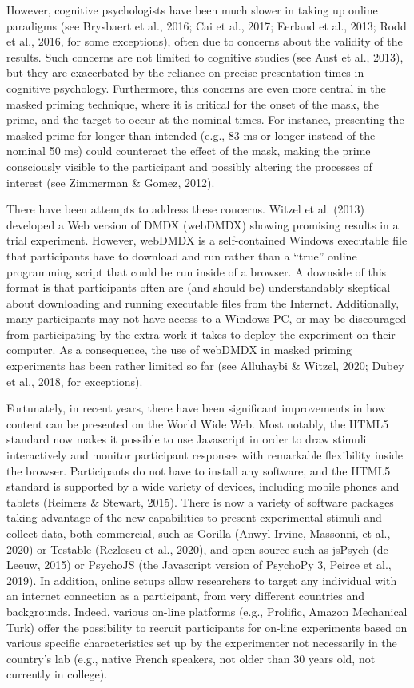 \documentclass[
  english,
  man,floatsintext]{apa6}
\begin{document}
However, cognitive psychologists have been much slower in taking up online paradigms (see Brysbaert et al., 2016; Cai et al., 2017; Eerland et al., 2013; Rodd et al., 2016, for some exceptions), often due to concerns about the validity of the results. Such concerns are not limited to cognitive studies (see Aust et al., 2013), but they are exacerbated by the reliance on precise presentation times in cognitive psychology. Furthermore, this concerns are even more central in the masked priming technique, where it is critical for the onset of the mask, the prime, and the target to occur at the nominal times. For instance, presenting the masked prime for longer than intended (e.g., 83 ms or longer instead of the nominal 50 ms) could counteract the effect of the mask, making the prime consciously visible to the participant and possibly altering the processes of interest (see Zimmerman \& Gomez, 2012).

There have been attempts to address these concerns. Witzel et al. (2013) developed a Web version of DMDX (webDMDX) showing promising results in a trial experiment. However, webDMDX is a self-contained Windows executable file that participants have to download and run rather than a ``true'' online programming script that could be run inside of a browser. A downside of this format is that participants often are (and should be) understandably skeptical about downloading and running executable files from the Internet. Additionally, many participants may not have access to a Windows PC, or may be discouraged from participating by the extra work it takes to deploy the experiment on their computer. As a consequence, the use of webDMDX in masked priming experiments has been rather limited so far (see Alluhaybi \& Witzel, 2020; Dubey et al., 2018, for exceptions).

Fortunately, in recent years, there have been significant improvements in how content can be presented on the World Wide Web. Most notably, the HTML5 standard now makes it possible to use Javascript in order to draw stimuli interactively and monitor participant responses with remarkable flexibility inside the browser. Participants do not have to install any software, and the HTML5 standard is supported by a wide variety of devices, including mobile phones and tablets (Reimers \& Stewart, 2015). There is now a variety of software packages taking advantage of the new capabilities to present experimental stimuli and collect data, both commercial, such as Gorilla (Anwyl-Irvine, Massonni, et al., 2020) or Testable (Rezlescu et al., 2020), and open-source such as jsPsych (de Leeuw, 2015) or PsychoJS (the Javascript version of PsychoPy 3, Peirce et al., 2019). In addition, online setups allow researchers to target any individual with an internet connection as a participant, from very different countries and backgrounds. Indeed, various on-line platforms (e.g., Prolific, Amazon Mechanical Turk) offer the possibility to recruit participants for on-line experiments based on various specific characteristics set up by the experimenter not necessarily in the country's lab (e.g., native French speakers, not older than 30 years old, not currently in college).
\end{document}
